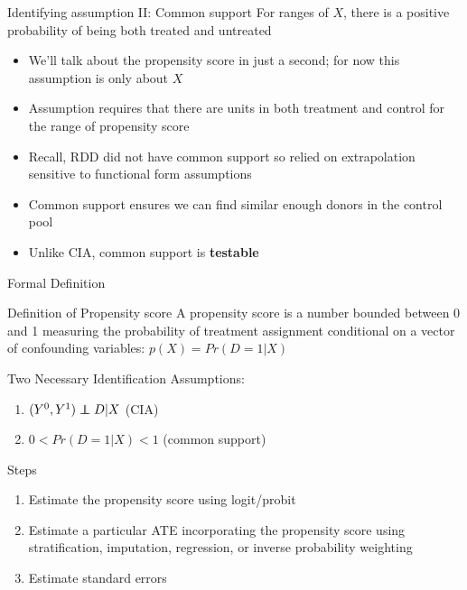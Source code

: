 \documentclass{beamer}
\newcommand\independent{\protect\mathpalette{\protect\independenT}{\perp}}
\def\independenT#1#2{\mathrel{\rlap{$#1#2$}\mkern2mu{#1#2}}}
\begin{document}
\begin{frame}[plain]

	\begin{block}{Identifying assumption II: Common support}
	For ranges of $X$, there is a positive probability of being both treated and untreated
	\end{block}
	
	\begin{itemize}
	\item We'll talk about the propensity score in just a second; for now this assumption is only about $X$
	\item Assumption requires that there are units in both treatment and control for the range of propensity score
	\item Recall, RDD did not have common support so relied on extrapolation sensitive to functional form assumptions
	\item Common support ensures we can find similar enough donors in the control pool
	\item Unlike CIA, common support is \textbf{testable}
	\end{itemize}
\end{frame}



\begin{frame}{Formal Definition}
	
	\begin{block}{Definition of Propensity score}
	A propensity score is a number bounded between 0 and 1 measuring the probability of treatment assignment conditional on a vector of confounding variables: $p(X)=Pr(D=1 | X)$
	\end{block}
	
	Two Necessary Identification Assumptions:
	\begin{enumerate}
	\item $(Y^0,Y^1) \independent{D}|X$ (CIA)
	\item $0<Pr(D=1|X)<1$ (common support)
	\end{enumerate}

\end{frame}


\begin{frame}{Steps}
	
		\begin{enumerate}
		\item Estimate the propensity score using logit/probit
		\item Estimate a particular ATE incorporating the propensity score using stratification, imputation, regression, or inverse probability weighting
		\item Estimate standard errors
		\end{enumerate}
\end{frame}
\end{document}
